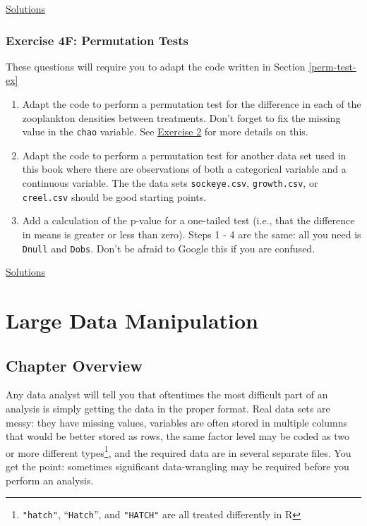 \documentclass[]{book}
\providecommand{\tightlist}{%
  \setlength{\itemsep}{0pt}\setlength{\parskip}{0pt}}
\let\rmarkdownfootnote\footnote%
\def\footnote{\protect\rmarkdownfootnote}
\theoremstyle{definition}
\theoremstyle{definition}
\theoremstyle{definition}
\theoremstyle{remark}
\begin{document}
\protect\hyperlink{ex4e-answers}{Solutions}

\subsection*{Exercise 4F: Permutation
Tests}\label{exercise-4f-permutation-tests}

These questions will require you to adapt the code written in Section
\ref{perm-test-ex}

\begin{enumerate}
\def\labelenumi{\arabic{enumi}.}
\tightlist
\item
  Adapt the code to perform a permutation test for the difference in
  each of the zooplankton densities between treatments. Don't forget to
  fix the missing value in the \texttt{chao} variable. See
  \protect\hyperlink{ex1b}{Exercise 2} for more details on this.
\item
  Adapt the code to perform a permutation test for another data set used
  in this book where there are observations of both a categorical
  variable and a continuous variable. The the data sets
  \texttt{sockeye.csv}, \texttt{growth.csv}, or \texttt{creel.csv}
  should be good starting points.
\item
  Add a calculation of the p-value for a one-tailed test (i.e., that the
  difference in means is greater or less than zero). Steps 1 - 4 are the
  same: all you need is \texttt{Dnull} and \texttt{Dobs}. Don't be
  afraid to Google this if you are confused.
\end{enumerate}

\protect\hyperlink{ex4f-answers}{Solutions}

\chapter{Large Data Manipulation}\label{ch5}

\section*{Chapter Overview}\label{chapter-overview-4}

Any data analyst will tell you that oftentimes the most difficult part
of an analysis is simply getting the data in the proper format. Real
data sets are messy: they have missing values, variables are often
stored in multiple columns that would be better stored as rows, the same
factor level may be coded as two or more different types\footnote{\texttt{"hatch"},
  ``\texttt{Hatch}'', and \texttt{"HATCH"} are all treated differently
  in R}, and the required data are in several separate files. You get
the point: sometimes significant data-wrangling may be required before
you perform an analysis.
\end{document}
